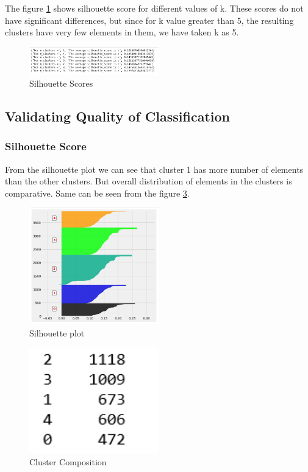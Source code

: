 The figure \ref{3.2} shows silhouette score for different values of k. These scores do not have significant differences, but since for k value greater than 5, the resulting clusters have very few elements in them, we have taken k as 5. 

\begin{figure}[H]
\caption{Silhouette Scores}
\label{3.2}
\centering
\includegraphics[width=0.5\textwidth]{images/3_2.PNG}
\end{figure}

\subsection{Validating Quality of Classification}

\subsubsection{\textbf{Silhouette Score}}

From the silhouette plot we can see that cluster 1 has more number of elements than the other clusters. But overall distribution of elements in the clusters is comparative. Same can be seen from the figure \ref{3.4}.

\begin{figure}[H]
\caption{Silhouette plot}
\label{3.3}
\centering
\includegraphics[width=0.5\textwidth]{images/3_3.PNG}
\end{figure}

\begin{figure}[H]
\caption{Cluster Composition}
\label{3.4}
\centering
\includegraphics[width=0.5\textwidth]{images/3_4.PNG}
\end{figure}

